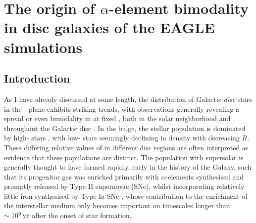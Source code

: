 \chapter{The origin of $\alpha$-element bimodality in disc galaxies of the EAGLE simulations}
\label{chapter:eagle}
\section{Introduction}
 \label{sec:intro}

As I have already discussed at some length, the distribution of Galactic  {\it disc} stars in the \afe{}-\feh{} plane exhibits striking trends, with observations generally revealing a spread or even bimodality in \afe{} at fixed \feh{}, both in the solar neighborhood \citep[e.g.][]{1998A&A...338..161F,2003A&A...410..527B,2000A&A...358..671G,2000AJ....120.2513P,2004AJ....128.1177V,2005A&A...433..185B,2012A&A...545A..32A,2014A&A...562A..71B} and throughout the Galactic disc \citep[][]{2014A&A...564A.115A,2014ApJ...796...38N,2015ApJ...808..132H}. In the bulge, the stellar population is dominated by high-\afe{} stars \citep[e.g.][]{2017arXiv170202971B}, with low-\afe{} stars seemingly declining in density with decreasing $R$. These differing relative values of \afe{} in different disc regions are often interpreted as evidence that these populations are distinct. The population with supersolar \afe{} is generally thought to have formed rapidly, early in the history of the Galaxy, such that its progenitor gas was enriched primarily with $\alpha$-elements synthesised and promptly released by Type II supernovae (SNe), whilst incorporating relatively little iron synthesised by Type Ia SNe \citep[e.g.,][]{1989ARA&A..27..279W,1997ARA&A..35..503M}, whose contribution to the enrichment of the interstellar medium only becomes important on timescales longer than $\sim 10^9\,{\rm yr}$ after the onset of star formation.

